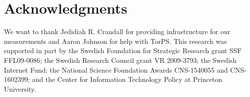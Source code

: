 \section*{Acknowledgments}
We want to thank Jedidiah R. Crandall for providing infrastructure for our
measurements and Aaron Johnson for help with TorPS.
%
This research was supported in part by the Swedish Foundation for Strategic
Research grant SSF FFL09-0086; the Swedish Research Council grant VR 2009-3793;
the Swedish Internet Fund; the National Science Foundation Awards CNS-1540055
and CNS-1602399; and the Center for Information Technology Policy at Princeton
University.
